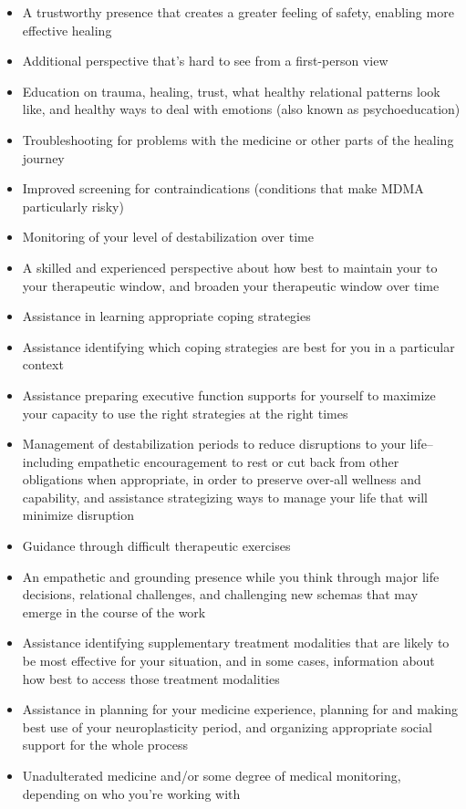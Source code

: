 \documentclass[12pt,letterpaper]{book}
\begin{document}
\begin{itemize}
    \item A trustworthy presence that creates a greater feeling of safety, enabling more effective healing
    \item Additional perspective that's hard to see from a first-person view
    \item Education on trauma, healing, trust, what healthy relational patterns look like, and healthy ways to deal with emotions (also known as psychoeducation)
    \item Troubleshooting for problems with the medicine or other parts of the healing journey
    \item Improved screening for contraindications (conditions that make MDMA particularly risky)
    \item Monitoring of your level of destabilization over time
    \item   A skilled and experienced perspective about how best to maintain your to your therapeutic window, and broaden your therapeutic window over time
    \item Assistance in learning appropriate coping strategies
    \item Assistance identifying which coping strategies are best for you in a particular context
    \item  Assistance preparing executive function supports for yourself to maximize your capacity to use the right strategies at the right times
    \item Management of destabilization periods to reduce disruptions to your life--including empathetic encouragement to rest or cut back from other obligations when appropriate, in order to preserve over-all wellness and capability, and assistance strategizing ways to manage your life that will minimize disruption 
    \item Guidance through difficult therapeutic exercises 
    \item An empathetic and grounding presence while you think through major life decisions, relational challenges, and challenging new schemas that may emerge in the course of the work
    \item Assistance identifying supplementary treatment modalities that are likely to be most effective for your situation, and in some cases, information about how best to access those treatment modalities
    \item Assistance in planning for your medicine experience, planning for and making best use of your neuroplasticity period, and organizing appropriate social support for the whole process
    \item Unadulterated medicine and/or some degree of medical monitoring, depending on who you're working with
\end{itemize}
\end{document}

